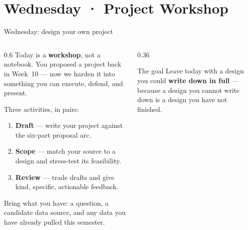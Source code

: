 \documentclass[9pt,aspectratio=169]{beamer}
\begin{document}
\section{Wednesday · Project Workshop}

\begin{frame}{Wednesday: design your own project}
    \begin{columns}[T]
        \begin{column}{0.6\textwidth}
            Today is a \textbf{workshop}, not a notebook. You proposed a project back in Week~10 --- now we harden it into something you can execute, defend, and present.

            \vspace{0.8em}

            Three activities, in pairs:
            \begin{enumerate}\small
                \item \textbf{Draft} --- write your project against the six-part proposal arc.
                \item \textbf{Scope} --- match your source to a design and stress-test its feasibility.
                \item \textbf{Review} --- trade drafts and give kind, specific, actionable feedback.
            \end{enumerate}

            \vspace{0.6em}

            Bring what you have: a question, a candidate data source, and any data you have already pulled this semester.
        \end{column}
        \begin{column}{0.36\textwidth}
            \begin{alertblock}{The goal}
                \footnotesize Leave today with a design you could \textbf{write down in full} --- because a design you cannot write down is a design you have not finished.
            \end{alertblock}
        \end{column}
    \end{columns}
\end{frame}
\end{document}
